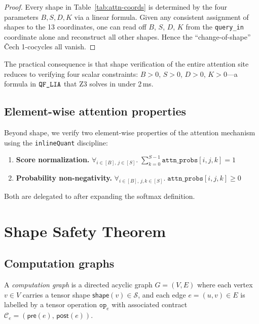 \documentclass[11pt]{article}
\newcommand{\TShape}[1]{\mathsf{shape}(#1)}       %
\newcommand{\TContract}{\mathcal{C}}               %
\newcommand{\TPre}[1]{\mathsf{pre}(#1)}            %
\newcommand{\TPost}[1]{\mathsf{post}(#1)}          %
\newcommand{\QForall}[2]{\forall_{#1}.\;#2}        %
\begin{document}
\begin{proof}
Every shape in Table~\ref{tab:attn-coords} is determined by the
four parameters $B, S, D, K$ via a linear formula.  Given any
consistent assignment of shapes to the 13 coordinates, one can read
off $B$, $S$, $D$, $K$ from the \texttt{query\_in} coordinate alone
and reconstruct all other shapes.  Hence the ``change-of-shape''
\v{C}ech 1-cocycles all vanish.
\end{proof}

The practical consequence is that shape verification of the entire
attention site reduces to verifying four scalar constraints:
$B > 0$, $S > 0$, $D > 0$, $K > 0$---a formula in $\texttt{QF\_LIA}$ that
Z3 solves in under 2\,ms.

\subsection{Element-wise attention properties}

Beyond shape, we verify two element-wise properties of the attention
mechanism using the \texttt{inlineQuant} discipline:

\begin{enumerate}[leftmargin=*]
\item \textbf{Score normalization.}
      $\QForall{i \in [B],\, j \in [S]}{\sum_{k=0}^{S-1}
      \texttt{attn\_probs}[i,j,k] = 1}$

\item \textbf{Probability non-negativity.}
      $\QForall{i \in [B],\, j,k \in [S]}{\texttt{attn\_probs}[i,j,k]
      \geq 0}$
\end{enumerate}

Both are delegated to \QFLRA{} after expanding the softmax
definition.

\section{Shape Safety Theorem}
\label{sec:thm}

\subsection{Computation graphs}

\begin{definition}
A \emph{computation graph} is a directed acyclic graph
$G = (V, E)$ where each vertex $v \in V$ carries a tensor shape
$\TShape{v} \in \mathcal{S}$, and each edge
$e = (u, v) \in E$ is labelled by a tensor operation $\mathtt{op}_e$
with associated contract
$\TContract_e = (\TPre{e},\, \TPost{e})$.
\end{definition}
\end{document}
